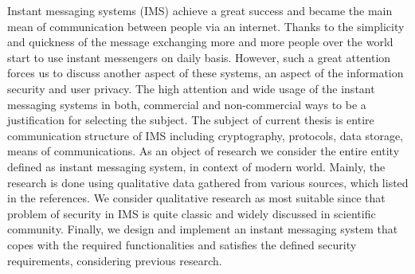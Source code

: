 Instant messaging systems (IMS) achieve a great success and became the main mean of communication
between people via an internet.
Thanks to the simplicity and quickness of the message exchanging more and more people over the world start to use
instant messengers on daily basis.
However, such a great attention forces us to discuss another aspect of these systems, an aspect of the
information security and user privacy.
The high attention and wide usage of the instant messaging systems in both, commercial and non-commercial ways to be
a justification for selecting the subject.
The subject of current thesis is entire communication structure of IMS including cryptography, protocols,
data storage, means of communications.
As an object of research we consider the entire entity defined as instant messaging system, in context of modern world.
Mainly, the research is done using qualitative data gathered from various sources, which listed in the references.
We consider qualitative research as most suitable since that problem of security in IMS is quite classic and widely
discussed in scientific community.
Finally, we design and implement an instant messaging system that copes with the required functionalities and satisfies
the defined security requirements, considering previous research.